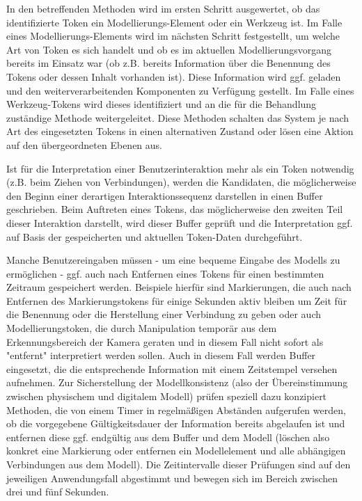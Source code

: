 In den betreffenden Methoden wird im ersten Schritt ausgewertet, ob das identifizierte Token ein Modellierungs-Element oder ein Werkzeug ist. Im Falle eines Modellierungs-Elements wird im nächsten Schritt festgestellt, um welche Art von Token es sich handelt und ob es im aktuellen Modellierungsvorgang bereits im Einsatz war (ob z.B. bereits Information über die Benennung des Tokens oder dessen Inhalt vorhanden ist). Diese Information wird ggf. geladen und den weiterverarbeitenden Komponenten zu Verfügung gestellt. Im Falle eines Werkzeug-Tokens wird dieses identifiziert und an die für die Behandlung zuständige Methode weitergeleitet. Diese Methoden schalten das System je nach Art des eingesetzten Tokens in einen alternativen Zustand oder lösen eine Aktion auf den übergeordneten Ebenen aus.

Ist für die Interpretation einer Benutzerinteraktion mehr als ein Token notwendig (z.B. beim Ziehen von Verbindungen), werden die Kandidaten, die möglicherweise den Beginn einer derartigen Interaktionssequenz darstellen in einen Buffer geschrieben. Beim Auftreten eines Tokens, das möglicherweise den zweiten Teil dieser Interaktion darstellt, wird dieser Buffer geprüft und die Interpretation ggf. auf Basis der gespeicherten und aktuellen Token-Daten durchgeführt.

Manche Benutzereingaben müssen - um eine bequeme Eingabe des Modells zu ermöglichen - ggf. auch nach Entfernen eines Tokens für einen bestimmten Zeitraum gespeichert werden. Beispiele hierfür sind Markierungen, die auch nach Entfernen des Markierungstokens für einige Sekunden aktiv bleiben um Zeit für die Benennung oder die Herstellung einer Verbindung zu geben oder auch Modellierungstoken, die durch Manipulation temporär aus dem Erkennungsbereich der Kamera geraten und in diesem Fall nicht sofort als "entfernt" interpretiert werden sollen. Auch in diesem Fall werden Buffer eingesetzt, die die entsprechende Information mit einem Zeitstempel versehen aufnehmen. Zur Sicherstellung der Modellkonsistenz (also der Übereinstimmung zwischen physischem und digitalem Modell) prüfen speziell dazu konzipiert Methoden, die von einem Timer in regelmäßigen Abständen aufgerufen werden, ob die vorgegebene Gültigkeitsdauer der Information bereits abgelaufen ist und entfernen diese ggf. endgültig aus dem Buffer und dem Modell (löschen also konkret eine Markierung oder entfernen ein Modellelement und alle abhängigen Verbindungen aus dem Modell). Die Zeitintervalle dieser Prüfungen sind auf den jeweiligen Anwendungsfall abgestimmt und bewegen sich im Bereich zwischen drei und fünf Sekunden.

